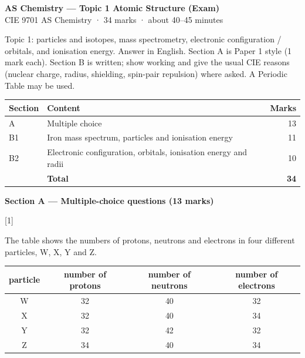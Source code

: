 \documentclass[10pt,a4paper]{article}
\newcommand{\homeworktitle}{Chemistry homework}
\newcommand{\homeworkmarks}{}
\newcommand{\sethomework}[2]{%
  \renewcommand{\homeworktitle}{#1}%
  \renewcommand{\homeworkmarks}{#2}%
}
\newcommand{\qhead}[2]{%
  \par\vspace{0.28em}%
  \Needspace{4.2em}%
  \noindent{\small\textbf{#1}}\hfill{\small[#2]}\par\vspace{0.08em}%
}
\begin{document}
\sethomework{AS Chemistry --- Topic 1 Atomic Structure (Exam)}{34 marks}

\begin{center}
{\large\bfseries AS Chemistry --- Topic 1 Atomic Structure (Exam)}\\[0.12em]
{\small CIE 9701 AS Chemistry · 34 marks · about 40--45 minutes}
\end{center}

{\small Topic 1: particles and isotopes, mass spectrometry, electronic configuration / orbitals, and ionisation energy.
Answer in English. Section A is Paper 1 style (1 mark each). Section B is written; show working and give the usual CIE reasons (nuclear charge, radius, shielding, spin-pair repulsion) where asked. A Periodic Table may be used.}

\vspace{0.15em}
{\small
\begin{tabular}{@{}llr@{}}
\toprule
\textbf{Section} & \textbf{Content} & \textbf{Marks} \\
\midrule
A & Multiple choice & 13 \\
B1 & Iron mass spectrum, particles and ionisation energy & 11 \\
B2 & Electronic configuration, orbitals, ionisation energy and radii & 10 \\
\midrule
 & \textbf{Total} & \textbf{34} \\
\bottomrule
\end{tabular}}

\vspace{0.30em}
{\large\bfseries Section A --- Multiple-choice questions (13 marks)}\par

\Needspace{14em}
\qhead{A1.}{1}
{\small The table shows the numbers of protons, neutrons and electrons in four different particles, W, X, Y and Z.}

\vspace{0.10em}
\centering
{\small
\begin{tabular}{cccc}
\toprule
particle & number of protons & number of neutrons & number of electrons \\
\midrule
W & 32 & 40 & 32 \\
X & 32 & 40 & 34 \\
Y & 32 & 42 & 32 \\
Z & 34 & 40 & 34 \\
\bottomrule
\end{tabular}}
\par\raggedright
\end{document}
